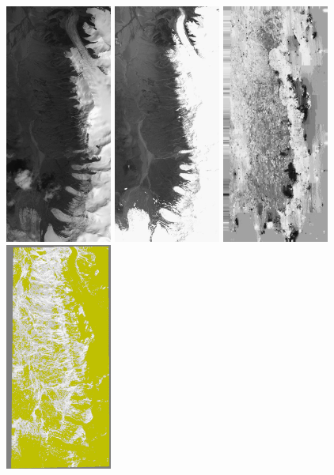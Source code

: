 \begin{figure}
\begin{center}
\includegraphics[width=35mm]{FIGS/SeismGuylia/250802_ortho.jpg}
\includegraphics[width=35mm]{FIGS/SeismGuylia/260608_ortho.jpg}
\includegraphics[width=35mm]{FIGS/SeismGuylia/Px1.jpg}
\includegraphics[width=35mm]{FIGS/SeismGuylia/Correl.jpg}


\end{center}
\end{figure}
